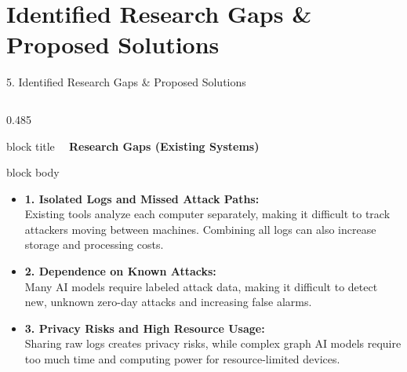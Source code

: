 \documentclass[aspectratio=169,10pt]{beamer}
\begin{document}
\section{Identified Research Gaps \& Proposed Solutions}

\begin{frame}[t]{5. Identified Research Gaps \& Proposed Solutions}
\vspace{-0.5em}
\begin{columns}[T]
\begin{column}{0.485\textwidth}
\begin{beamercolorbox}[rounded=true,shadow=false,sep=0.32em,wd=\linewidth]{block title}
\textbf{\scriptsize \textcolor{limitRed}{\textbullet\ } Research Gaps (Existing Systems)}
\end{beamercolorbox}
\vspace{0.1em}
\begin{beamercolorbox}[rounded=true,shadow=false,sep=0.40em,wd=\linewidth]{block body}
{\fontsize{7.0pt}{9.6pt}\selectfont
\begin{itemize}\itemsep0.48em
  \item \textbf{1. Isolated Logs and Missed Attack Paths:}\\
  Existing tools analyze each computer separately, making it difficult to track attackers moving between machines. Combining all logs can also increase storage and processing costs.
  
  \item \textbf{2. Dependence on Known Attacks:}\\
  Many AI models require labeled attack data, making it difficult to detect new, unknown zero-day attacks and increasing false alarms.
  
  \item \textbf{3. Privacy Risks and High Resource Usage:}\\
  Sharing raw logs creates privacy risks, while complex graph AI models require too much time and computing power for resource-limited devices.
\end{itemize}
}
\end{beamercolorbox}
\end{column}


\end{columns}
\end{frame}
\end{document}
